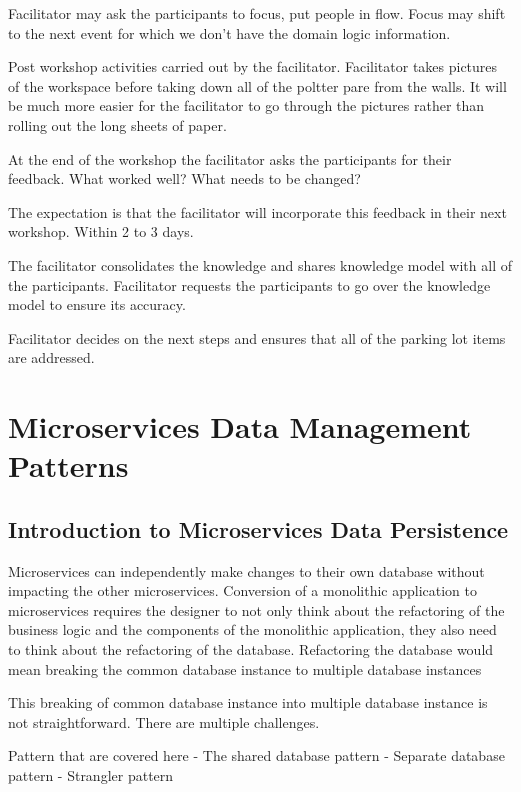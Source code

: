 \documentclass[a4paper, 11pt]{book}
\begin{document}
    Facilitator may ask the participants to focus, put people in flow.
    Focus may shift to the next event for which we don't have the domain logic information.

    Post workshop activities carried out by the facilitator.
    Facilitator takes pictures of the workspace before taking down all of the poltter pare from the walls.
    It will be much more easier for the facilitator to go through the pictures rather than rolling out the long sheets of paper.

    At the end of the workshop the facilitator asks the participants for their feedback.
    What worked well?
    What needs to be changed?

    The expectation is that the facilitator will incorporate this feedback in their next workshop.
    Within 2 to 3 days.

    The facilitator consolidates the knowledge and shares knowledge model with all of the participants.
    Facilitator requests the participants to go over the knowledge model to ensure its accuracy.

    Facilitator decides on the next steps and ensures that all of the parking lot items are addressed.



    \chapter{Microservices Data Management Patterns}


    \section{Introduction to Microservices Data Persistence}
    Microservices can independently make changes to their own database without impacting the other microservices.
    Conversion of a monolithic application to microservices requires the designer to not only think about the refactoring of the business logic and the components of the monolithic application,
    they also need to think about the refactoring of the database.
    Refactoring the database would mean breaking the common database instance to multiple database instances

    This breaking of common database instance into multiple database instance is not straightforward.
    There are multiple challenges.

    Pattern that are covered here
    - The shared database pattern
    - Separate database pattern
    - Strangler pattern
\end{document}
